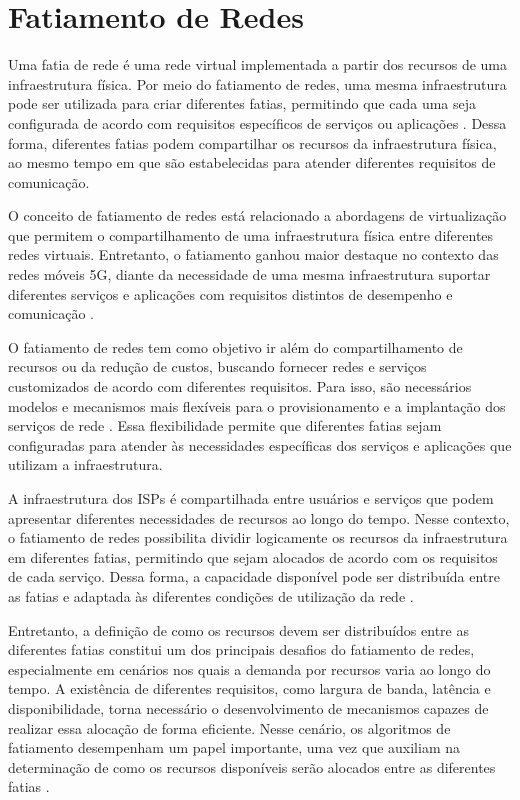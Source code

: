 \section{Fatiamento de Redes}

Uma fatia de rede é uma rede virtual implementada a partir dos recursos de uma infraestrutura física. Por meio do fatiamento de redes, uma mesma infraestrutura pode ser utilizada para criar diferentes fatias, permitindo que cada uma seja configurada de acordo com requisitos específicos de serviços ou aplicações \cite{zhang2017slicingbased5g}. Dessa forma, diferentes fatias podem compartilhar os recursos da infraestrutura física, ao mesmo tempo em que são estabelecidas para atender diferentes requisitos de comunicação.

O conceito de fatiamento de redes está relacionado a abordagens de virtualização que permitem o compartilhamento de uma infraestrutura física entre diferentes redes virtuais. Entretanto, o fatiamento ganhou maior destaque no contexto das redes móveis 5G, diante da necessidade de uma mesma infraestrutura suportar diferentes serviços e aplicações com requisitos distintos de desempenho e comunicação \cite{foukas2017network}.

O fatiamento de redes tem como objetivo ir além do compartilhamento de recursos ou da redução de custos, buscando fornecer redes e serviços customizados de acordo com diferentes requisitos. Para isso, são necessários modelos e mecanismos mais flexíveis para o provisionamento e a implantação dos serviços de rede \cite{boubendir2019network}. Essa flexibilidade permite que diferentes fatias sejam configuradas para atender às necessidades específicas dos serviços e aplicações que utilizam a infraestrutura.

A infraestrutura dos ISPs é compartilhada entre usuários e serviços que podem apresentar diferentes necessidades de recursos ao longo do tempo. Nesse contexto, o fatiamento de redes possibilita dividir logicamente os recursos da infraestrutura em diferentes fatias, permitindo que sejam alocados de acordo com os requisitos de cada serviço. Dessa forma, a capacidade disponível pode ser distribuída entre as fatias e adaptada às diferentes condições de utilização da rede \cite{gomes2020strategies}.

Entretanto, a definição de como os recursos devem ser distribuídos entre as diferentes fatias constitui um dos principais desafios do fatiamento de redes, especialmente em cenários nos quais a demanda por recursos varia ao longo do tempo. A existência de diferentes requisitos, como largura de banda, latência e disponibilidade, torna necessário o desenvolvimento de mecanismos capazes de realizar essa alocação de forma eficiente. Nesse cenário, os algoritmos de fatiamento desempenham um papel importante, uma vez que auxiliam na determinação de como os recursos disponíveis serão alocados entre as diferentes fatias \cite{vassilaras2017algorithmic}.

